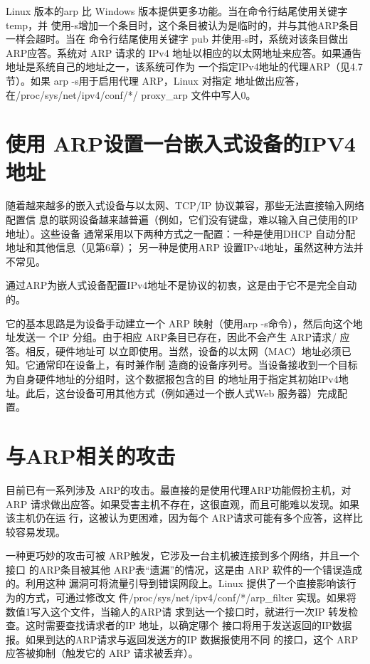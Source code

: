Linux 版本的arp 比 Windows 版本提供更多功能。当在命令行结尾使用关键字 temp，并
使用-s增加一个条目时，这个条目被认为是临时的，并与其他ARP条目一样会超时。当在
命令行结尾使用关键字 pub 并使用-s时，系统对该条目做出 ARP应答。系统对 ARP 请求的
IPv4 地址以相应的以太网地址来应答。如果通告地址是系统自己的地址之一，该系统可作为
一个指定IPv4地址的代理ARP（见4.7节）。如果 arp -s用于启用代理 ARP，Linux 对指定
地址做出应答，在/proc/sys/net/ipv4/conf/*/ proxy\_arp 文件中写人0。

\section{使用 ARP设置一台嵌入式设备的IPV4 地址}

随着越来越多的嵌入式设备与以太网、TCP/IP 协议兼容，那些无法直接输入网络配置信
息的联网设备越来越普遍（例如，它们没有键盘，难以输入自己使用的IP地址）。这些设备
通常采用以下两种方式之一配置：一种是使用DHCP 自动分配地址和其他信息（见第6章）；
另一种是使用ARP 设置IPv4地址，虽然这种方法并不常见。

通过ARP为嵌人式设备配置IPv4地址不是协议的初衷，这是由于它不是完全自动的。

它的基本思路是为设备手动建立一个 ARP 映射（使用arp -s命令），然后向这个地址发送一
个IP 分组。由于相应 ARP条目已存在，因此不会产生 ARP请求/ 应答。相反，硬件地址可
以立即使用。当然，设备的以太网（MAC）地址必须已知。它通常印在设备上，有时兼作制
造商的设备序列号。当设备接收到一个目标为自身硬件地址的分组时，这个数据报包含的目
的地址用于指定其初始IPv4地址。此后，这台设备可用其他方式（例如通过一个嵌人式Web
服务器）完成配置。

\section{与ARP相关的攻击}

目前已有一系列涉及 ARP的攻击。最直接的是使用代理ARP功能假扮主机，对ARP
请求做出应答。如果受害主机不存在，这很直观，而且可能难以发现。如果该主机仍在运
行，这被认为更困难，因为每个 ARP请求可能有多个应答，这样比较容易发现。

一种更巧妙的攻击可被 ARP触发，它涉及一台主机被连接到多个网络，并且一个接口
的ARP条目被其他 ARP表“遗漏”的情况，这是由 ARP 软件的一个错误造成的。利用这种
漏洞可将流量引导到错误网段上。Linux 提供了一个直接影响该行为的方式，可通过修改文
件/proc/sys/net/ipv4/conf/*/arp\_filter 实现。如果将数值1写入这个文件，当输人的ARP请
求到达一个接口时，就进行一次IP 转发检查。这时需要查找请求者的IP 地址，以确定哪个
接口将用于发送返回的IP数据报。如果到达的ARP请求与返回发送方的IP 数据报使用不同
的接口，这个 ARP应答被抑制（触发它的 ARP 请求被丢弃）。

